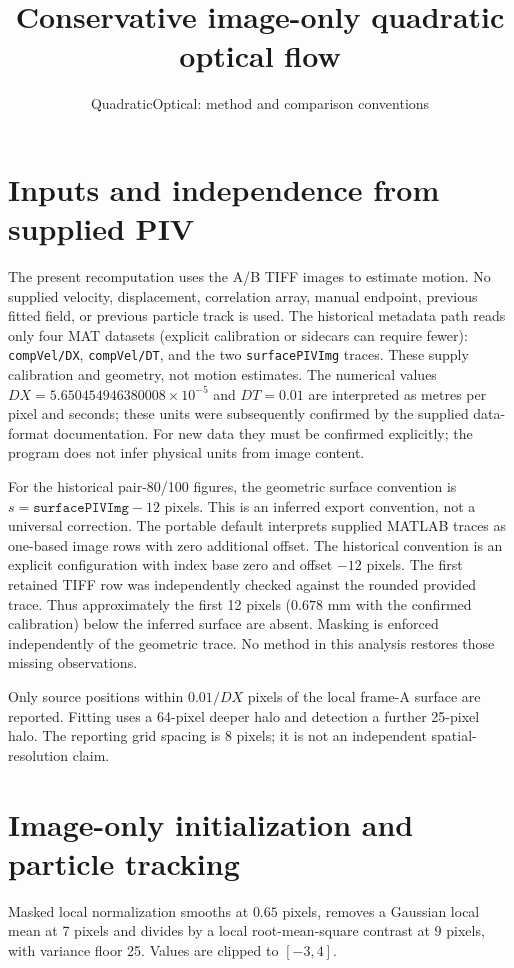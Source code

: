 \documentclass[11pt]{article}
\title{Conservative image-only quadratic optical flow}
\author{QuadraticOptical: method and comparison conventions}
\date{}
\begin{document}
\maketitle

\section{Inputs and independence from supplied PIV}
The present recomputation uses the A/B TIFF images to estimate motion. No supplied velocity, displacement, correlation array, manual endpoint, previous fitted field, or previous particle track is used. The historical metadata path reads only four MAT datasets (explicit calibration or sidecars can require fewer): \texttt{compVel/DX}, \texttt{compVel/DT}, and the two \texttt{surfacePIVImg} traces. These supply calibration and geometry, not motion estimates. The numerical values $DX=5.650454946380008\times10^{-5}$ and $DT=0.01$ are interpreted as metres per pixel and seconds; these units were subsequently confirmed by the supplied data-format documentation. For new data they must be confirmed explicitly; the program does not infer physical units from image content.

For the historical pair-80/100 figures, the geometric surface convention is $s=\texttt{surfacePIVImg}-12$ pixels. This is an inferred export convention, not a universal correction. The portable default interprets supplied MATLAB traces as one-based image rows with zero additional offset. The historical convention is an explicit configuration with index base zero and offset $-12$ pixels. The first retained TIFF row was independently checked against the rounded provided trace. Thus approximately the first 12 pixels ($0.678$ mm with the confirmed calibration) below the inferred surface are absent. Masking is enforced independently of the geometric trace. No method in this analysis restores those missing observations.

Only source positions within $0.01/DX$ pixels of the local frame-A surface are reported. Fitting uses a 64-pixel deeper halo and detection a further 25-pixel halo. The reporting grid spacing is 8 pixels; it is not an independent spatial-resolution claim.

\section{Image-only initialization and particle tracking}
Masked local normalization smooths at $0.65$ pixels, removes a Gaussian local mean at 7 pixels and divides by a local root-mean-square contrast at 9 pixels, with variance floor 25. Values are clipped to $[-3,4]$.
\end{document}
